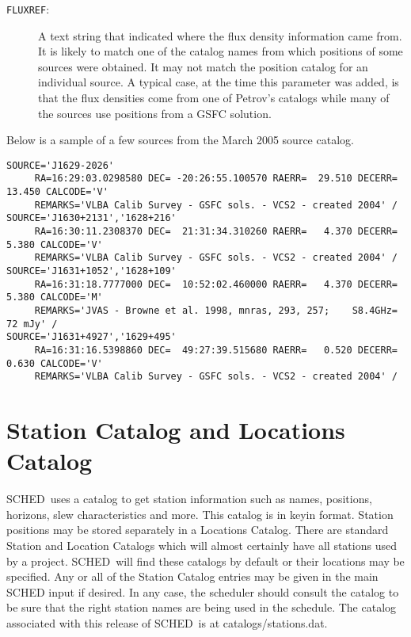\documentclass{report}
\newcommand{\schedb}{{\sc SCHED~}}
\begin{document}
\begin{description}
\item [{\tt FLUXREF}:] A text string that indicated where the flux
density information came from.  It is likely to match one of the
catalog names from which positions of some sources were obtained.
It may not match the position catalog for an individual source.  A
typical case, at the time this parameter was added, is that the flux
densities come from one of Petrov's catalogs while many of the sources
use positions from a GSFC solution.


\end{description}

Below is a sample of a few sources from the March 2005 source catalog.

\begin{verbatim}
SOURCE='J1629-2026'
     RA=16:29:03.0298580 DEC= -20:26:55.100570 RAERR=  29.510 DECERR=  13.450 CALCODE='V'
     REMARKS='VLBA Calib Survey - GSFC sols. - VCS2 - created 2004' /
SOURCE='J1630+2131','1628+216'
     RA=16:30:11.2308370 DEC=  21:31:34.310260 RAERR=   4.370 DECERR=   5.380 CALCODE='V'
     REMARKS='VLBA Calib Survey - GSFC sols. - VCS2 - created 2004' /
SOURCE='J1631+1052','1628+109'
     RA=16:31:18.7777000 DEC=  10:52:02.460000 RAERR=   4.370 DECERR=   5.380 CALCODE='M'
     REMARKS='JVAS - Browne et al. 1998, mnras, 293, 257;    S8.4GHz=    72 mJy' /
SOURCE='J1631+4927','1629+495'
     RA=16:31:16.5398860 DEC=  49:27:39.515680 RAERR=   0.520 DECERR=   0.630 CALCODE='V'
     REMARKS='VLBA Calib Survey - GSFC sols. - VCS2 - created 2004' /
\end{verbatim}


\section{\label{SEC:STACAT}Station Catalog and Locations Catalog}

\schedb uses a catalog to get station information such as names,
positions, horizons, slew characteristics and more.  This catalog is
in keyin format.  Station positions may be stored separately in a
Locations Catalog.  There are standard Station and Location Catalogs
which will almost certainly have all stations used by a project.
\schedb will find these catalogs by default or their locations may be
specified.  Any or all of the Station Catalog entries may be given in
the main {\sc SCHED} input if desired.  In any case, the scheduler
should consult the catalog to be sure that the right station names are
being used in the schedule.  The catalog associated with this release
of \schedb is at 
{catalogs/stations.dat}.
\end{document}

